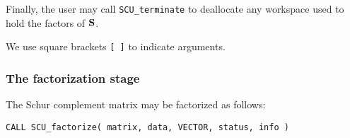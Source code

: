\documentclass{galahad}
\newcommand{\packagename}{SCU}
\begin{document}
Finally, the user may call {\tt \packagename\_terminate}
to deallocate any workspace used to hold the factors of ${\mathbf{S}}$.

We use square brackets {\tt [ ]} to indicate \optional arguments.









\subsubsection{The factorization stage}
The Schur complement matrix may be factorized as follows:
\vspace*{1mm}

\hskip0.5in
{\tt CALL \packagename\_factorize( matrix, data, VECTOR, status, info )}
\end{document}
